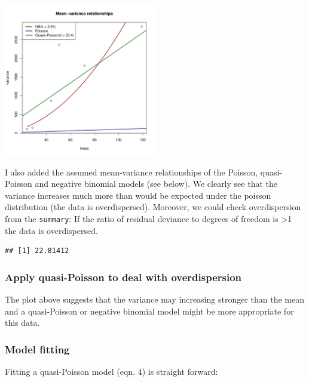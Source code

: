 \begin{knitrout}
{\centering \includegraphics[width=0.5\textwidth]{appendix/usetheglm/two/mod_count_meanvar-1} 

}



\end{knitrout}

I also added the assumed mean-variance relationships of the Poisson, quasi-Poisson and negative binomial models (see below).
We clearly see that the variance increases much more than would be expected under the poisson distribution (the data is overdispersed).
Moreover, we could check overdispersion from the \texttt{summary}:
If the ratio of residual deviance to degrees of freedom is \textgreater 1 the data is overdispersed.
\begin{knitrout}
\color{fgcolor}\begin{kframe}
\begin{alltt}
\hlopt{$} \hlopt{/} \hlopt{$}
\end{alltt}
\begin{verbatim}
## [1] 22.81412
\end{verbatim}
\end{kframe}
\end{knitrout}




\subsubsection{Apply quasi-Poisson to deal with overdispersion}
The plot above suggests that the variance may increasing stronger than the mean and a quasi-Poisson or negative binomial model might be more appropriate for this data.

\subsubsection{Model fitting}
Fitting a quasi-Poisson model (eqn. 4) is straight forward:
\begin{knitrout}
\color{fgcolor}\begin{kframe}
\begin{alltt}
 \hlkwb{<-}  \hlopt{~}     \hlstd{=} \hlstd{)}
\end{alltt}
\end{kframe}
\end{knitrout}


